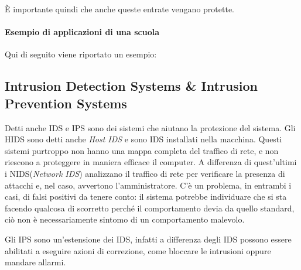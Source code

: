 È importante quindi che anche queste entrate vengano protette.

\paragraph*{Esempio di applicazioni di una scuola}

Qui di seguito viene riportato un esempio:

\begin{table}[H]
\centering
{}
\caption{Un esempio di diversi canali di accesso logici per una infrastruttura
universitaria}
\end{table}

\subsection{Intrusion Detection Systems \& Intrusion Prevention Systems}

Detti anche IDS e IPS sono dei sistemi che aiutano la protezione del sistema.
Gli HIDS sono detti anche \textit{Host IDS} e sono IDS installati nella
macchina. Questi sistemi purtroppo non hanno una mappa completa del traffico di
rete, e non riescono a proteggere in maniera efficace il computer. A differenza
di quest'ultimi i NIDS(\textit{Network IDS}) analizzano il traffico di rete per
verificare la presenza di attacchi e, nel caso, avvertono l'amministratore. C'è
un problema, in entrambi i casi, di falsi positivi da tenere conto: il sistema
potrebbe individuare che si sta facendo qualcosa di scorretto perché il
comportamento devia da quello standard, ciò non è necessariamente sintomo di un
comportamento malevolo. 
\par Gli IPS sono un'estensione dei IDS, infatti a differenza degli IDS possono
essere abilitati a eseguire azioni di correzione, come bloccare le intrusioni
oppure mandare allarmi.

